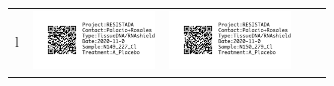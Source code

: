 \documentclass[10pt,notitlepage,letterpaper]{article}
\def\s{\phantom{xx}}
\def\w{1.27in}
\def\h{-0.030in}
\begin{document}
\begin{tabular}[t]{ c @{\s} c @{\s} c @{\s} c @{\s} c }
l} & \includegraphics[width=\w]{label_N149_227_Cl} & \includegraphics[width=\w]{label_N150_279_Cl} \\[\h]

\end{tabular}
\end{document}
